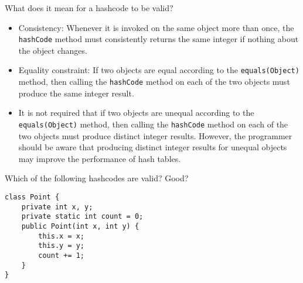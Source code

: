 \begin{blocksection}
\question What does it mean for a hashcode to be valid?
\begin{solution}[0.75in]
\begin{itemize}
\item Consistency: Whenever it is invoked on the same object more than once,
the \lstinline$hashCode$ method must consistently returns the same integer if
nothing about the object changes.
\item Equality constraint: If two objects are equal according to the
\lstinline$equals(Object)$ method, then calling the \lstinline$hashCode$ method
on each of the two objects must produce the same integer result.
\item It is not required that if two objects are unequal according to the
\lstinline$equals(Object)$ method, then calling the \lstinline$hashCode$ method
on each of the two objects must produce distinct integer results. However, the
programmer should be aware that producing distinct integer results for unequal
objects may improve the performance of hash tables.
\end{itemize}
\end{solution}
\end{blocksection}

\question Which of the following hashcodes are valid? Good?

\begin{lstlisting}
class Point {
    private int x, y;
    private static int count = 0;
    public Point(int x, int y) {
        this.x = x;
        this.y = y;
        count += 1;
    }
}
\end{lstlisting}

